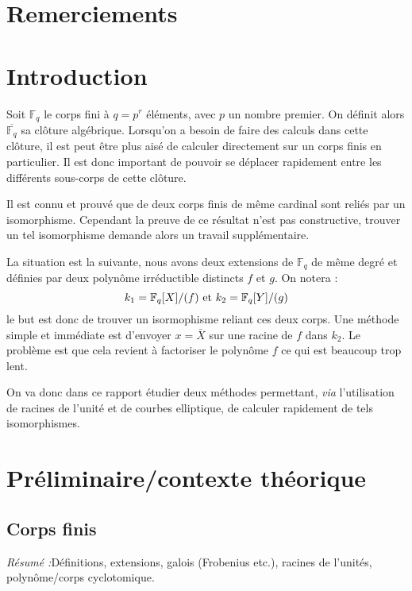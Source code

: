 \documentclass[a4paper]{article} %
\numberwithin{equation}{section}
\newcommand\GF[1]{\mathbb{F}_{#1}}
\begin{document}
\newtheorem{thm}{Thèorème}[section]
\newtheorem{lem}[thm]{Lemme}
\newtheorem{cor}{Corollaire}[thm]
\newtheorem{prop}[thm]{Proposition}
\theoremstyle{definition}
\newtheorem{defn}[thm]{Définition}
\newtheorem*{ex}{Exemple}
\theoremstyle{remark}
\newtheorem{rem}{Remarque}[thm]
\section*{Remerciements}
\section*{Introduction}
Soit $\GF{q}$ le corps fini à $q = p^r$ éléments, avec $p$ un nombre premier. On
définit alors $\overline{\GF{q}}$ sa clôture algébrique. Lorsqu'on a besoin de
faire des calculs dans cette clôture, il est peut être plus aisé de calculer
directement sur un corps finis en particulier. Il est donc important de pouvoir
se déplacer rapidement entre les différents sous-corps de cette clôture.\par
Il est connu et prouvé que de deux corps finis de même cardinal sont reliés par
un isomorphisme. Cependant la preuve de ce résultat n'est pas constructive,
trouver un tel isomorphisme demande alors un travail supplémentaire.\par
La situation est la suivante, nous avons deux extensions de $\GF{q}$ de même
degré et définies par deux polynôme irréductible distincts $f$ et $g$. On notera
:
\[k_1=\GF{q}[X]/(f)\textup{ et }k_2=\GF{q}[Y]/(g)\]
le but est donc de trouver un isormophisme reliant ces deux corps. Une méthode
simple et immédiate est d'envoyer $x = \bar{X}$ sur une racine de $f$ dans
$k_2$. Le problème est que cela revient à factoriser le polynôme $f$ ce qui est
beaucoup trop lent.\par
On va donc dans ce rapport étudier deux méthodes permettant, \textit{via}
l'utilisation de racines de l'unité et de courbes elliptique, de calculer
rapidement de tels isomorphismes.


\section{Préliminaire/contexte théorique}

\subsection{Corps finis}
\textit{Résumé :}Définitions, extensions, galois (Frobenius etc.), racines de 
l'unités, polynôme/corps cyclotomique.
\end{document}
